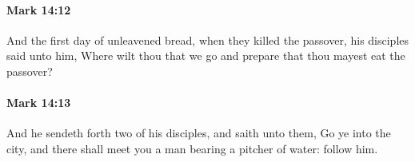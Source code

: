 		\paragraph{Mark 14:12} %
			\label{MARK-14-12}

			And the first day of unleavened bread, when they killed the passover, his disciples said unto him, Where wilt thou that we go and prepare that thou mayest eat the passover?

			\begin{framed}
			\scriptsize
				\begin{compactdesc}
					\item[SBLG] 
				\end{compactdesc}
			\end{framed}

		\paragraph{Mark 14:13} %
			\label{MARK-14-13}

			And he sendeth forth two of his disciples, and saith unto them, Go ye into the city, and there shall meet you a man bearing a pitcher of water: follow him.

